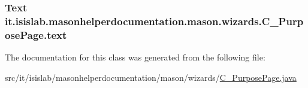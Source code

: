 \hypertarget{classit_1_1isislab_1_1masonhelperdocumentation_1_1mason_1_1wizards_1_1_c___purpose_page_abeec86a6fae75f2a485faeade141dd81}{
\subsubsection[{text}]{\setlength{\rightskip}{0pt plus 5cm}Text it.\-isislab.\-masonhelperdocumentation.\-mason.\-wizards.\-C\-\_\-\-Purpose\-Page.\-text\hspace{0.3cm}{\ttfamily [private]}}}\label{classit_1_1isislab_1_1masonhelperdocumentation_1_1mason_1_1wizards_1_1_c___purpose_page_abeec86a6fae75f2a485faeade141dd81}


The documentation for this class was generated from the following file\-:\begin{DoxyCompactItemize}
\item 
src/it/isislab/masonhelperdocumentation/mason/wizards/\hyperlink{_c___purpose_page_8java}{C\-\_\-\-Purpose\-Page.\-java}\end{DoxyCompactItemize}

